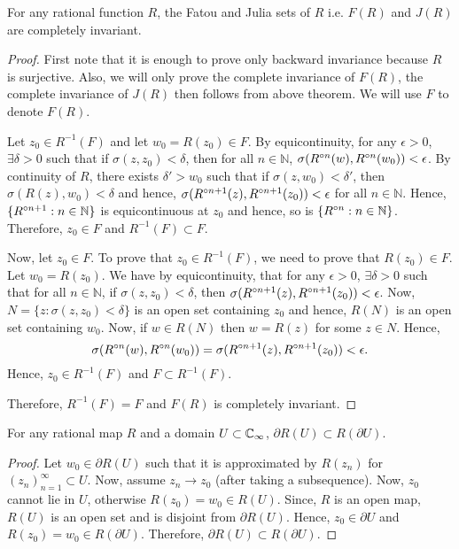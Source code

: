 \begin{theorem}
	For any rational function \( R \), the Fatou and Julia sets of \( R \) i.e. \( F(R) \) and
	\( J(R) \) are completely invariant.
\end{theorem}
\begin{proof}
	First note that it is enough to prove only backward invariance because \( R \) is surjective.
	Also, we will only prove the complete invariance of \( F(R) \), the complete invariance of \( J(R) \) then follows
	from above theorem. We will use \( F \) to denote \( F(R) \).

	Let \( z_0\in R^{-1}(F) \) and let \( w_0=R(z_0)\in F \). By equicontinuity, for any \( \epsilon>0 \), \( \exists \delta>0 \) such
	that if \( \sigma(z,z_0)<\delta \), then for all \( n \in \mathbb{N} \), \( \sigma(\ror[n](w),\ror[n](w_0))<\epsilon \). By continuity of \( R \),
	there exists \( \delta'>w_0 \) such that if \( \sigma(z,w_0)<\delta' \), then \( \sigma(R(z),w_0)<\delta \) and hence,
	\( \sigma(\ror[n+1](z),\ror[n+1](z_0))<\epsilon \) for all \( n\in \mathbb{N} \). Hence, \( \{\ror[n+1]:n \in \mathbb{N}\} \) is equicontinuous 
	at \( z_0 \) and hence, so is \( \{\ror[n]:n \in \mathbb{N}\} \). Therefore, \( z_0 \in F \) and \( R^{-1}(F) \subset F \). 

	Now, let \( z_0 \in F \). To prove that \( z_0\in R^{-1}(F) \), we need to prove that \( R(z_0)\in F \). Let \( w_0=R(z_0) \).
	We have by equicontinuity, that for any \(\epsilon>0  \), \( \exists \delta>0 \) such that for all \( n \in  \mathbb{N} \), if \( \sigma(z,z_0)<\delta \), then \( \sigma(\ror[n+1](z),\ror[n+1](z_0))<\epsilon \). Now, \( N=\{z:\sigma(z,z_0)<\delta\} \) is an open set containing \( z_0 \)
	and hence, \( R(N) \) is an open set containing \( w_0 \). Now, if \( w\in R(N) \) then \( w=R(z) \) for some \( z\in N \). Hence, \[
		\sigma(\ror[n](w),\ror[n](w_0))=\sigma(\ror[n+1](z),\ror[n+1](z_0))<\epsilon
	.\] Hence, \( z_0\in R^{-1}(F) \) and \( F \subset R^{-1}(F) \).

Therefore, \( R^{-1}(F)=F \) and \( F(R) \) is completely invariant.
\end{proof} 

\begin{lemma}\label{thm1.3}
For any rational map \( R \) and a domain \( U \subset  \mathbb{C}_\infty\), \( \partial R(U) \subset R(\partial U) \).
\end{lemma}
\begin{proof}
	Let \( w_0\in \partial R(U) \) such that it is approximated by \( R(z_n) \) for \( (z_n)_{n=1}^\infty \subset U \).
	Now, assume \( z_n\to z_0 \) (after taking a subsequence). Now, \( z_0 \) cannot lie in \( U \), otherwise \( R(z_0)=w_0 \in R(U) \).
	Since, \( R \) is an open map, \( R(U) \) is an open set and is disjoint from \( \partial R(U) \). Hence, \( z_0\in \partial U \)
	and \( R(z_0)=w_0 \in R(\partial U) \). Therefore, \( \partial R(U) \subset R(\partial U) \).
\end{proof}

